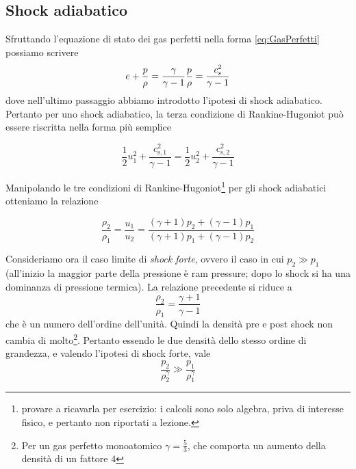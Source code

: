 \subsection{Shock adiabatico}
Sfruttando l'equazione di stato dei gas perfetti nella forma \ref{eq:GasPerfetti} possiamo scrivere
\begin{align*}
e + \dfrac{p}{\rho} = \dfrac{\gamma}{\gamma -1} \dfrac{p}{\rho} = \dfrac{\textit{c}_{s}^2}{\gamma-1}
\end{align*}
dove nell'ultimo passaggio abbiamo introdotto l'ipotesi di shock adiabatico. Pertanto per uno shock adiabatico, la terza condizione di Rankine-Hugoniot può essere riscritta nella forma più semplice
\begin{EQ}
\begin{equation}
\dfrac{1}{2}u_1^2 + \dfrac{c_{\mathrm{s},1}^2}{\gamma -1} = \dfrac{1}{2}u_2^2 + \dfrac{c_{\mathrm{s},2}^2}{\gamma -1}
\end{equation}
\end{EQ}
Manipolando le tre condizioni di Rankine-Hugoniot\footnote{provare a ricavarla per esercizio: i calcoli sono solo algebra, priva di interesse fisico, e pertanto non riportati a lezione.} per gli shock adiabatici otteniamo la relazione
\begin{EQ}
\begin{equation}
\dfrac{\rho_2}{\rho_1} = \dfrac{u_1}{u_2} = \dfrac{(\gamma+1)p_2 + (\gamma -1) p_1}{(\gamma+1)p_1 + (\gamma -1) p_2}
\end{equation}
\end{EQ}
Consideriamo ora il caso limite di \textit{shock forte}, ovvero il caso in cui $p_2 \gg p_1$ (all'inizio la maggior parte della pressione è ram pressure; dopo lo shock si ha una dominanza di pressione termica). La relazione precedente si riduce a 
\begin{equation}
\dfrac{\rho_2}{\rho_1} = \dfrac{\gamma+1}{\gamma-1}
\end{equation}
che è un numero dell'ordine dell'unità. Quindi la densità pre e post shock non cambia di molto\footnote{Per un gas perfetto monoatomico $\gamma=\frac{5}{3}$, che comporta un aumento della densità di un fattore $4$}. Pertanto essendo le due densità dello stesso ordine di grandezza, e valendo l'ipotesi di shock forte, vale
\begin{equation}
\dfrac{p_2}{\rho_2^\gamma} \gg \dfrac{p_1}{\rho_1^\gamma}
\end{equation}
